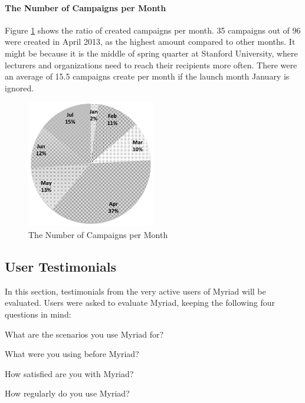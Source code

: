 \paragraph{The Number of Campaigns per Month} Figure \ref{fig:ChartCampaignsMonths} shows the ratio of created campaigns per month. 35 campaigns out of 96 were created in April 2013, as the highest amount compared to other months. It might be because it is the middle of spring quarter at Stanford University, where lecturers and organizations need to reach their recipients more often. There were an average of 15.5 campaigns create per month if the launch month January is ignored.

\begin{figure}[htbp]
	\centering
	\includegraphics[width=0.50\textwidth]{imgs/ChartCampaignsMonths.png}
	\caption[The Number of Campaigns per Month]{The Number of Campaigns per Month}
	\label{fig:ChartCampaignsMonths}
\end{figure}

\subsection{User Testimonials}
\label{subsec:5.4.2:UserTest}

In this section, testimonials from the very active users of Myriad will be evaluated. Users were asked to evaluate Myriad, keeping the following four questions in mind:

\begin{compactenum}
	\item What are the scenarios you use Myriad for?
	\item What were you using before Myriad?
	\item How satisfied are you with Myriad?
	\item How regularly do you use Myriad?
\end{compactenum}

